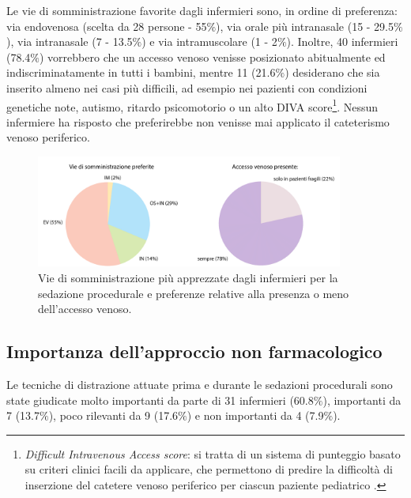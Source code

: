 Le vie di somministrazione favorite dagli infermieri sono, in ordine di preferenza: via endovenosa (scelta da 28 persone - 55$\%$), via orale più intranasale (15 - 29.5$\%$), via intranasale (7 - 13.5$\%$) e via intramuscolare (1 - 2$\%$). Inoltre, 40 infermieri (78.4$\%$) vorrebbero che un accesso venoso venisse posizionato abitualmente ed indiscriminatamente in tutti i bambini, mentre 11 (21.6$\%$) desiderano che sia inserito almeno nei casi più difficili, ad esempio nei pazienti con condizioni genetiche note, autismo, ritardo psicomotorio o un alto DIVA score\footnote{\emph{Difficult Intravenous Access score}: si tratta di un sistema di punteggio basato su criteri clinici facili da applicare, che permettono di predire la difficoltà di inserzione del catetere venoso periferico per ciascun paziente pediatrico \cite{Yen2008}.}. Nessun infermiere ha risposto che preferirebbe non venisse mai applicato il cateterismo venoso periferico. 

\begin{figure}[!h]
    \centering
    \includegraphics[width=0.9\textwidth]{Figure/sommicrosoftchiaro.pdf}
    \caption{Vie di somministrazione più apprezzate dagli infermieri per la sedazione procedurale e preferenze relative alla presenza o meno dell'accesso venoso.}
    \label{fig:viedisomm}
\end{figure}

\newpage

\subsection*{Importanza dell'approccio non farmacologico}

Le tecniche di distrazione attuate prima e durante le sedazioni procedurali sono state giudicate molto importanti da parte di 31 infermieri (60.8$\%$), importanti da 7 (13.7$\%$), poco rilevanti da 9 (17.6$\%$) e non importanti da 4 (7.9$\%$).

